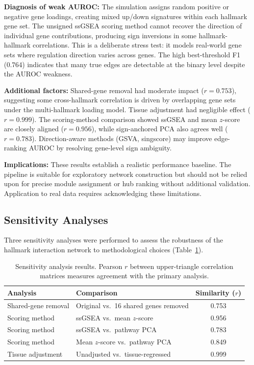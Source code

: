 \documentclass[11pt,a4paper]{article}
\begin{document}
\textbf{Diagnosis of weak AUROC:} The simulation assigns random positive or negative gene loadings, creating mixed up/down signatures within each hallmark gene set. The unsigned ssGSEA scoring method cannot recover the direction of individual gene contributions, producing sign inversions in some hallmark-hallmark correlations. This is a deliberate stress test: it models real-world gene sets where regulation direction varies across genes. The high best-threshold F1 (0.764) indicates that many true edges are detectable at the binary level despite the AUROC weakness.

\textbf{Additional factors:} Shared-gene removal had moderate impact ($r = 0.753$), suggesting some cross-hallmark correlation is driven by overlapping gene sets under the multi-hallmark loading model. Tissue adjustment had negligible effect ($r = 0.999$). The scoring-method comparison showed ssGSEA and mean $z$-score are closely aligned ($r = 0.956$), while sign-anchored PCA also agrees well ($r = 0.783$). Direction-aware methods (GSVA, singscore) may improve edge-ranking AUROC by resolving gene-level sign ambiguity.

\textbf{Implications:} These results establish a realistic performance baseline. The pipeline is suitable for exploratory network construction but should not be relied upon for precise module assignment or hub ranking without additional validation. Application to real data requires acknowledging these limitations.

\subsection{Sensitivity Analyses}

Three sensitivity analyses were performed to assess the robustness of the hallmark interaction network to methodological choices (Table~\ref{tab:sensitivity}).

\begin{table}[H]
\centering
\caption{Sensitivity analysis results. Pearson $r$ between upper-triangle correlation matrices measures agreement with the primary analysis.}
\label{tab:sensitivity}
\small
\begin{tabular}{llc}
\toprule
\textbf{Analysis} & \textbf{Comparison} & \textbf{Similarity ($r$)} \\
\midrule
Shared-gene removal & Original vs.\ 16 shared genes removed & 0.753 \\
Scoring method & ssGSEA vs.\ mean $z$-score & 0.956 \\
Scoring method & ssGSEA vs.\ pathway PCA & 0.783 \\
Scoring method & Mean $z$-score vs.\ pathway PCA & 0.849 \\
Tissue adjustment & Unadjusted vs.\ tissue-regressed & 0.999 \\
\bottomrule
\end{tabular}
\end{table}
\end{document}
